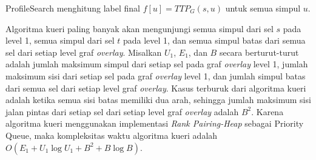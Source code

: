 \begin{algorithm}
\caption{ProfileSearch menghitung label final $f[u]=TTP_G(s,u)$ untuk semua simpul $u$.} 
\label{alg:profileSearch}
\end{algorithm}

Algoritma kueri paling banyak akan mengunjungi semua simpul dari sel $s$ pada level 1, semua simpul dari sel $t$ pada level 1, dan semua simpul batas dari semua sel dari setiap level graf \textit{overlay}. Misalkan $U_1$, $E_1$, dan $B$ secara berturut-turut adalah jumlah maksimum simpul dari setiap sel pada graf \textit{overlay} level 1, jumlah maksimum sisi dari setiap sel pada graf \textit{overlay} level 1, dan jumlah simpul batas  dari semua sel dari setiap level graf \textit{overlay}. Kasus terburuk dari algoritma kueri adalah ketika semua sisi batas memiliki dua arah, sehingga jumlah maksimum sisi jalan pintas dari setiap sel dari setiap level graf \textit{overlay} adalah $B^2$. Karena algoritma kueri menggunakan implementasi \textit{Rank Pairing-Heap} sebagai Priority Queue, maka kompleksitas waktu algoritma kueri adalah $O(E_1+U_1\log U_1+B^{2}+B \log B)$.





